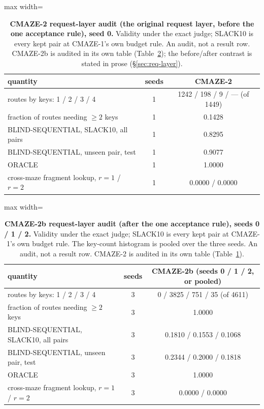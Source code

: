 \documentclass{article} %
\begin{document}
\begin{table}[h]
\centering\small
\caption{\textbf{CMAZE-2 request-layer audit (the original request layer, before the one
acceptance rule), seed 0.} Validity under the exact judge; SLACK10 is every kept pair at %
CMAZE-1's own budget rule. An audit, not a result row. CMAZE-2b is audited in its own table
(Table~\ref{tab:req2b}); the before/after contrast is stated in prose (\S\ref{sec:req-layer}).}
\label{tab:req}
\setlength{\tabcolsep}{3pt}
\begin{adjustbox}{max width=\linewidth}\begin{tabular}{lcc}
\toprule
quantity & seeds & CMAZE-2 \\
\midrule
routes by keys: 1 / 2 / 3 / 4 & 1 & 1242 / 198 / 9 / --- (of 1449) \\
fraction of routes needing $\ge2$ keys & 1 & 0.1428 \\
BLIND-SEQUENTIAL, SLACK10, all pairs & 1 & 0.8295 \\
BLIND-SEQUENTIAL, unseen pair, test & 1 & 0.9077 \\
ORACLE & 1 & 1.0000 \\
cross-maze fragment lookup, $r=1$ / $r=2$ & 1 & 0.0000 / 0.0000 \\
\bottomrule
\end{tabular}\end{adjustbox}
\end{table}

\begin{table}[h]
\centering\small
\caption{\textbf{CMAZE-2b request-layer audit (after the one acceptance rule), seeds 0 / 1 / 2.} %
Validity under the exact judge; SLACK10 is every kept pair at CMAZE-1's own budget rule. The
key-count histogram is pooled over the three seeds. An audit, not a result row. CMAZE-2 is
audited in its own table (Table~\ref{tab:req}).}
\label{tab:req2b}
\setlength{\tabcolsep}{3pt}
\begin{adjustbox}{max width=\linewidth}\begin{tabular}{lcc}
\toprule
quantity & seeds & CMAZE-2b (seeds 0 / 1 / 2, or pooled) \\
\midrule
routes by keys: 1 / 2 / 3 / 4 & 3 & 0 / 3825 / 751 / 35 (of 4611) \\
fraction of routes needing $\ge2$ keys & 3 & 1.0000 \\
BLIND-SEQUENTIAL, SLACK10, all pairs & 3 & 0.1810 / 0.1553 / 0.1068 \\
BLIND-SEQUENTIAL, unseen pair, test & 3 & 0.2344 / 0.2000 / 0.1818 \\
ORACLE & 3 & 1.0000 \\
cross-maze fragment lookup, $r=1$ / $r=2$ & 3 & 0.0000 / 0.0000 \\
\bottomrule
\end{tabular}\end{adjustbox}
\end{table}
\end{document}
